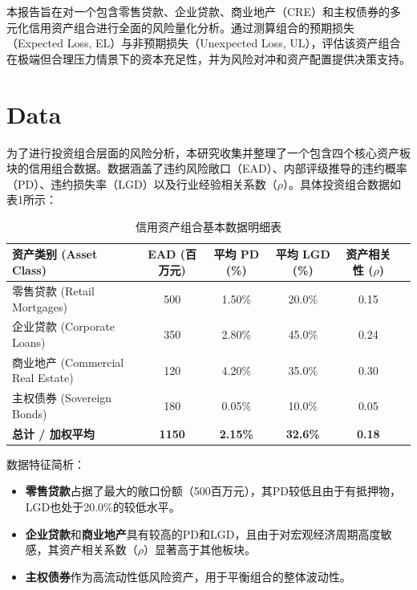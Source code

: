 \documentclass[12pt]{article}
\begin{document}
本报告旨在对一个包含零售贷款、企业贷款、商业地产（CRE）和主权债券的多元化信用资产组合进行全面的风险量化分析。通过测算组合的预期损失（Expected Loss, EL）与非预期损失（Unexpected Loss, UL），评估该资产组合在极端但合理压力情景下的资本充足性，并为风险对冲和资产配置提供决策支持。


\section{Data}
为了进行投资组合层面的风险分析，本研究收集并整理了一个包含四个核心资产板块的信用组合数据。数据涵盖了违约风险敞口（EAD）、内部评级推导的违约概率（PD）、违约损失率（LGD）以及行业经验相关系数（$\rho$）。具体投资组合数据如表1所示：

\begin{table}[H]
\centering
\caption{信用资产组合基本数据明细表}
\label{tab:portfolio_data}
\vspace{0.2cm}
\begin{tabular}{lccccc}
\toprule
\textbf{资产类别 (Asset Class)} & \textbf{EAD (百万元)} & \textbf{平均 PD (\%)} & \textbf{平均 LGD (\%)} & \textbf{资产相关性 ($\rho$)} \\
\midrule
零售贷款 (Retail Mortgages)   & 500 & 1.50\% & 20.0\% & 0.15 \\
企业贷款 (Corporate Loans)   & 350 & 2.80\% & 45.0\% & 0.24 \\
商业地产 (Commercial Real Estate) & 120 & 4.20\% & 35.0\% & 0.30 \\
主权债券 (Sovereign Bonds)    & 180 & 0.05\% & 10.0\% & 0.05 \\
\midrule
\textbf{总计 / 加权平均}       & \textbf{1150} & \textbf{2.15\%} & \textbf{32.6\%} & \textbf{0.18} \\
\bottomrule
\end{tabular}
\end{table}

数据特征简析：
\begin{itemize}
    \item \textbf{零售贷款}占据了最大的敞口份额（500百万元），其PD较低且由于有抵押物，LGD也处于20.0\%的较低水平。
    \item \textbf{企业贷款}和\textbf{商业地产}具有较高的PD和LGD，且由于对宏观经济周期高度敏感，其资产相关系数（$\rho$）显著高于其他板块。
    \item \textbf{主权债券}作为高流动性低风险资产，用于平衡组合的整体波动性。
\end{itemize}
\end{document}
